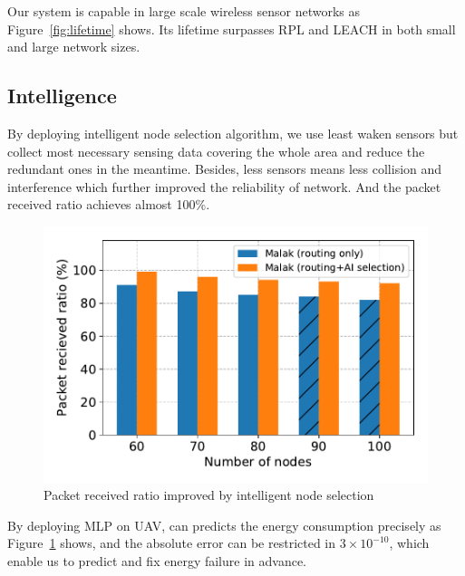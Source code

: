 Our {\sdn} system is capable in large scale wireless sensor networks as
Figure~\ref{fig:lifetime} shows. Its lifetime surpasses RPL and LEACH in both
small and large network sizes.

\subsection{Intelligence}

By deploying intelligent node selection algorithm, we use least waken sensors
but collect most necessary sensing data covering the whole area and reduce the
redundant ones in the meantime. Besides, less sensors means less collision and
interference which further improved the reliability of network. And the packet
received ratio achieves almost 100\%.

\begin{figure}[htbp]
	\centering
	\includegraphics[width=.95\columnwidth]{Figure/ai_selection}
	\vspace{-0.1in}
	\caption{Packet received ratio improved by intelligent node selection
		\textnormal{
		}}
	\label{fig:ai_selection}
\end{figure}

By deploying MLP on UAV, {\sdn} can predicts the energy consumption precisely as
Figure~\ref{fig:ai_selection} shows, and the absolute error can be restricted in
$3\times10^{-10}$, which enable us to predict and fix energy failure in advance.

